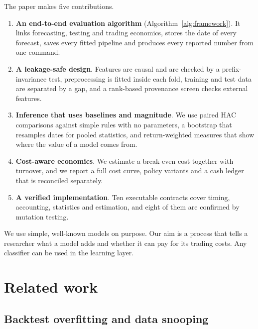 \documentclass[preprint,12pt,authoryear,a4paper]{elsarticle}
\begin{document}
The paper makes five contributions.
\begin{enumerate}
\item \textbf{An end-to-end evaluation algorithm} (Algorithm~\ref{alg:framework}).
It links forecasting, testing and trading economics, stores the date of every
forecast, saves every fitted pipeline and produces every reported number from one
command.
\item \textbf{A leakage-safe design}. Features are causal and are checked by a
prefix-invariance test, preprocessing is fitted inside each fold, training and test
data are separated by a gap, and a rank-based provenance screen checks external
features.
\item \textbf{Inference that uses baselines and magnitude}. We use paired HAC
comparisons against simple rules with no parameters, a bootstrap that resamples
dates for pooled statistics, and return-weighted measures that show where the value
of a model comes from.
\item \textbf{Cost-aware economics}. We estimate a break-even cost together with
turnover, and we report a full cost curve, policy variants and a cash ledger that
is reconciled separately.
\item \textbf{A verified implementation}. Ten executable contracts cover timing,
accounting, statistics and estimation, and eight of them are confirmed by mutation
testing.
\end{enumerate}

We use simple, well-known models on purpose. Our aim is a process that tells a
researcher what a model adds and whether it can pay for its trading costs. Any
classifier can be used in the learning layer.

\section{Related work}\label{sec:related}

\subsection{Backtest overfitting and data snooping}
\end{document}

